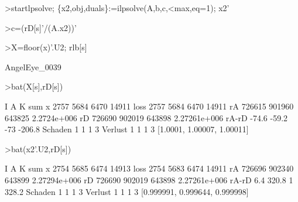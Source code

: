\documentclass[a4paper,10pt]{article}
\begin{document}
\begin{eulernotebook}
\begin{eulerprompt}
>startlpsolve; \{x2,obj,duals\}:=ilpsolve(A,b,c,<max,eq=1); x2'
\end{eulerprompt}
\begin{euleroutput}
  [2754,  5685,  6474]
\end{euleroutput}
\begin{eulerprompt}
>c=(rD[s]'/(A.x2))'
\end{eulerprompt}
\begin{euleroutput}
  [0.999991,  0.999644,  0.999998]
\end{euleroutput}
\begin{eulerprompt}
>X=floor(x)'.U2; rlb[s]
\end{eulerprompt}
\begin{euleroutput}
  AngelEye_0039
\end{euleroutput}
\begin{eulerprompt}
>bat(X[s],rD[s])
\end{eulerprompt}
\begin{euleroutput}
                             I             A             K           sum
               x          2757          5684          6470         14911
            loss          2757          5684          6470         14911
              rA        726615        901960        643825   2.2724e+006
              rD        726690        902019        643898  2.27261e+006
           rA-rD         -74.6         -59.2           -73        -206.8
         Schaden             1             1             1             3
         Verlust             1             1             1             3
  [1.0001,  1.00007,  1.00011]
\end{euleroutput}
\begin{eulerprompt}
>bat(x2'.U2,rD[s])
\end{eulerprompt}
\begin{euleroutput}
                             I             A             K           sum
               x          2754          5685          6474         14913
            loss          2754          5683          6474         14911
              rA        726696        902340        643899  2.27294e+006
              rD        726690        902019        643898  2.27261e+006
           rA-rD           6.4         320.8             1         328.2
         Schaden             1             1             1             3
         Verlust             1             1             1             3
  [0.999991,  0.999644,  0.999998]
\end{euleroutput}

\end{eulernotebook}
\end{document}
